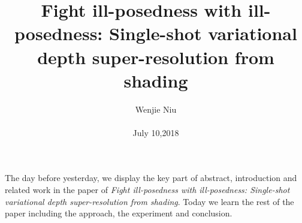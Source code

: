 \documentclass[10pt,twocolumn,letterpaper]{article}
\begin{document}
\title{Fight ill-posedness with ill-posedness: Single-shot variational depth super-resolution from shading}

\author{Wenjie Niu\\\\ July 10,2018}

\maketitle
The day before yesterday, we display the key part of abstract, introduction and related work in the paper of \emph{Fight ill-posedness with ill-posedness: Single-shot variational depth super-resolution from shading}. Today we learn the rest of the paper including the approach, the experiment and conclusion.\par
\end{document}
